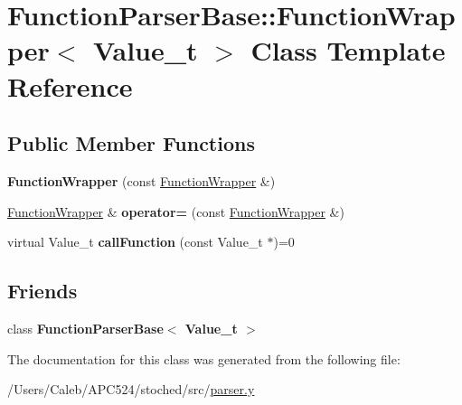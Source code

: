 \hypertarget{class_function_parser_base_1_1_function_wrapper}{}\section{Function\+Parser\+Base\+:\+:Function\+Wrapper$<$ Value\+\_\+t $>$ Class Template Reference}
\label{class_function_parser_base_1_1_function_wrapper}
\subsection*{Public Member Functions}
\begin{DoxyCompactItemize}
\item 
\mbox{\label{class_function_parser_base_1_1_function_wrapper_a77a8e2085b1e74a06cdcfc24828a3cce}} 
{\bfseries Function\+Wrapper} (const \hyperlink{class_function_parser_base_1_1_function_wrapper}{Function\+Wrapper} \&)
\item 
\mbox{\label{class_function_parser_base_1_1_function_wrapper_addadbef8890ad70616e67ac59ce021a6}} 
\hyperlink{class_function_parser_base_1_1_function_wrapper}{Function\+Wrapper} \& {\bfseries operator=} (const \hyperlink{class_function_parser_base_1_1_function_wrapper}{Function\+Wrapper} \&)
\item 
\mbox{\label{class_function_parser_base_1_1_function_wrapper_a6528ad7e50401ce8d6c8d5b3c813aa41}} 
virtual Value\+\_\+t {\bfseries call\+Function} (const Value\+\_\+t $\ast$)=0
\end{DoxyCompactItemize}
\subsection*{Friends}
\begin{DoxyCompactItemize}
\item 
\mbox{\label{class_function_parser_base_1_1_function_wrapper_a0c2cfe8c970c6fd489bfe42c8fdf45d6}} 
class {\bfseries Function\+Parser\+Base$<$ Value\+\_\+t $>$}
\end{DoxyCompactItemize}


The documentation for this class was generated from the following file\+:\begin{DoxyCompactItemize}
\item 
/\+Users/\+Caleb/\+A\+P\+C524/stoched/src/\hyperlink{parser_8y}{parser.\+y}\end{DoxyCompactItemize}
